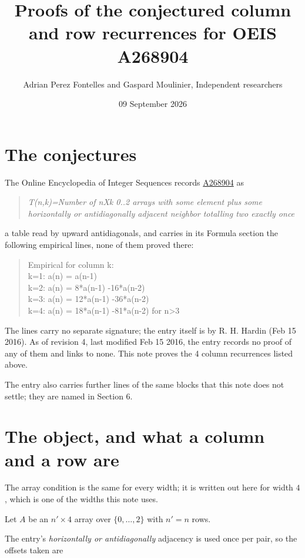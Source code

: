 \documentclass[11pt]{article}
\title{Proofs of the conjectured column and row recurrences for OEIS A268904}
\author{Adrian Perez Fontelles and Gaspard Moulinier, Independent researchers}
\date{09 September 2026}
\theoremstyle{definition}
\begin{document}
\maketitle
\section{The conjectures}

The Online Encyclopedia of Integer Sequences records \href{https://oeis.org/A268904}{A268904} as

\begin{quote}\itshape T(n,k)=Number of nXk 0..2 arrays with some element plus some horizontally or antidiagonally adjacent neighbor totalling two exactly once\end{quote}

a table read by upward antidiagonals, and carries in its Formula section the following empirical lines, none of them proved there:

\begin{quote}\ttfamily Empirical for column k:\\
k=1: a(n) = a(n-1)\\k=2: a(n) = 8*a(n-1) -16*a(n-2)\\k=3: a(n) = 12*a(n-1) -36*a(n-2)\\k=4: a(n) = 18*a(n-1) -81*a(n-2) for n>3\end{quote}

The lines carry no separate signature; the entry itself is by R. H. Hardin (Feb 15 2016). As of revision 4, last modified Feb 15 2016, the entry records no proof of any of them and links to none. This note proves the 4 column recurrences listed above.

The entry also carries further lines of the same blocks that this note does not settle; they are named in Section 6.

\section{The object, and what a column and a row are}

The array condition is the same for every width; it is written out here for width $4$, which is one of the widths this note uses.

Let $A$ be an $n' \times 4$ array over $\{0,\dots,2\}$ with $n' = n$ rows.

The entry's {\itshape horizontally or antidiagonally} adjacency is used once per pair, so the offsets taken are
\end{document}
